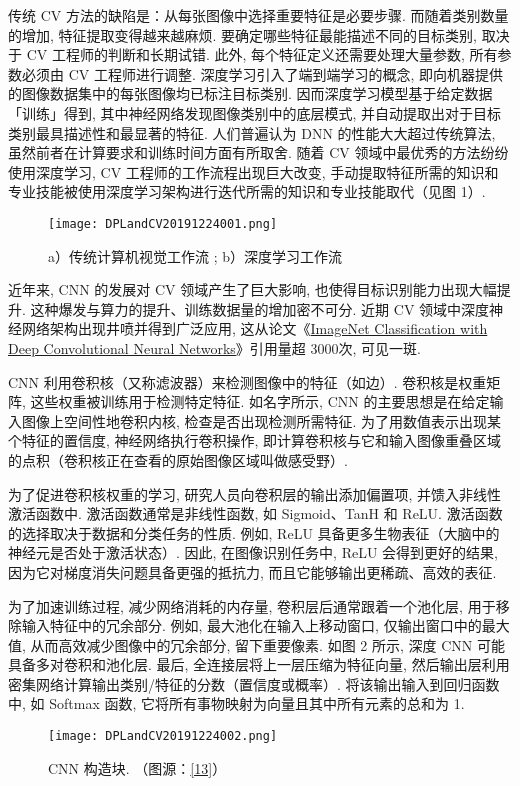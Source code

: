 传统 CV 方法的缺陷是：从每张图像中选择重要特征是必要步骤. 而随着类别数量的增加, 特征提取变得越来越麻烦. 要确定哪些特征最能描述不同的目标类别, 取决于 CV 工程师的判断和长期试错. 此外, 每个特征定义还需要处理大量参数, 所有参数必须由 CV 工程师进行调整.
深度学习引入了端到端学习的概念, 即向机器提供的图像数据集中的每张图像均已标注目标类别. 因而深度学习模型基于给定数据「训练」得到, 其中神经网络发现图像类别中的底层模式, 并自动提取出对于目标类别最具描述性和最显著的特征. 人们普遍认为 DNN 的性能大大超过传统算法, 虽然前者在计算要求和训练时间方面有所取舍. 随着 CV 领域中最优秀的方法纷纷使用深度学习, CV 工程师的工作流程出现巨大改变, 手动提取特征所需的知识和专业技能被使用深度学习架构进行迭代所需的知识和专业技能取代（见图 1）.
\begin{figure}[http]
    \centering
    \texttt{[image: DPLandCV20191224001.png]}
    \caption{a）传统计算机视觉工作流 ; b）深度学习工作流\cite{WANG2018144}}
    \label{DPLandCV20191224001}
\end{figure}

近年来, CNN 的发展对 CV 领域产生了巨大影响, 也使得目标识别能力出现大幅提升. 这种爆发与算力的提升、训练数据量的增加密不可分. 近期 CV 领域中深度神经网络架构出现井喷并得到广泛应用, 这从论文《\href{http://papers.nips.cc/paper/4824-imagenet-classification-with-deep-convolutional-neural-networks}{ImageNet Classification with Deep Convolutional Neural Networks}》引用量超 3000次, 可见一斑.

CNN 利用卷积核（又称滤波器）来检测图像中的特征（如边）. 卷积核是权重矩阵, 这些权重被训练用于检测特定特征. 如名字所示, CNN 的主要思想是在给定输入图像上空间性地卷积内核, 检查是否出现检测所需特征. 为了用数值表示出现某个特征的置信度, 神经网络执行卷积操作, 即计算卷积核与它和输入图像重叠区域的点积（卷积核正在查看的原始图像区域叫做感受野）.

为了促进卷积核权重的学习, 研究人员向卷积层的输出添加偏置项, 并馈入非线性激活函数中. 激活函数通常是非线性函数, 如 Sigmoid、TanH 和 ReLU. 激活函数的选择取决于数据和分类任务的性质. 例如, ReLU 具备更多生物表征（大脑中的神经元是否处于激活状态）. 因此, 在图像识别任务中, ReLU 会得到更好的结果, 因为它对梯度消失问题具备更强的抵抗力, 而且它能够输出更稀疏、高效的表征.

为了加速训练过程, 减少网络消耗的内存量, 卷积层后通常跟着一个池化层, 用于移除输入特征中的冗余部分. 例如, 最大池化在输入上移动窗口, 仅输出窗口中的最大值, 从而高效减少图像中的冗余部分, 留下重要像素. 如图 2 所示, 深度 CNN 可能具备多对卷积和池化层. 最后, 全连接层将上一层压缩为特征向量, 然后输出层利用密集网络计算输出类别/特征的分数（置信度或概率）. 将该输出输入到回归函数中, 如 Softmax 函数, 它将所有事物映射为向量且其中所有元素的总和为 1.
\begin{figure}[http]
\centering
\texttt{[image: DPLandCV20191224002.png]}
\caption{CNN 构造块. （图源：\href{https://adeshpande3.github.io/adeshpande3.github.io/A-Beginner\%27s-Guide-To-Understanding-Convolutional-Neural-Networks/}{[13]}）}
\label{DPLandCV20191224002}
\end{figure}

